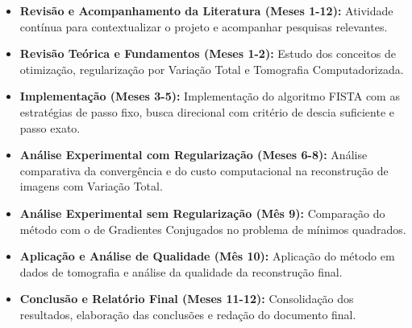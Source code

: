 \documentclass[12pt]{article}
\begin{document}
\begin{itemize}

    \item[A1] \textbf{Revisão e Acompanhamento da Literatura (Meses 1-12):} 
    Atividade contínua para contextualizar o projeto e acompanhar pesquisas relevantes.

    \item[A2] \textbf{Revisão Teórica e Fundamentos (Meses 1-2):} 
    Estudo dos conceitos de otimização, regularização por Variação Total e Tomografia Computadorizada.

    \item[A3] \textbf{Implementação (Meses 3-5):} 
    Implementação do algoritmo FISTA com as estratégias de passo fixo, busca direcional com critério de descia suficiente e passo exato.

    \item[A4] \textbf{Análise Experimental com Regularização (Meses 6-8):} 
    Análise comparativa da convergência e do custo computacional na reconstrução de imagens com Variação Total.

    \item[A5] \textbf{Análise Experimental sem Regularização (Mês 9):} 
    Comparação do método com o de Gradientes Conjugados no problema de mínimos quadrados.

    \item[A6] \textbf{Aplicação e Análise de Qualidade (Mês 10):} 
    Aplicação do método em dados de tomografia e análise da qualidade da reconstrução final.

    \item[A7] \textbf{Conclusão e Relatório Final (Meses 11-12):} 
    Consolidação dos resultados, elaboração das conclusões e redação do documento final.
\end{itemize}

\newcommand{\X}{\textbullet}
\end{document}
